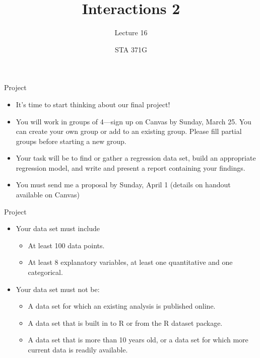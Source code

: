 \documentclass{beamer}\usepackage[]{graphicx}\usepackage[]{color}
\title{Interactions 2}
\subtitle{Lecture 16}
\author{STA 371G}
\begin{document}
  
  

  \frame{\maketitle}



  \begin{darkframes}
      \begin{frame}{Project}
      \begin{itemize}
        \item It's time to start thinking about our final project!
	\item You will work in groups of 4---sign up on Canvas by Sunday, March 25. You can create your own group or add to an existing group. Please fill partial groups before starting a new group.
	\item Your task will be to find or gather a regression data set, build an appropriate regression model, and write and present a report containing your findings.
	\item You must send me a proposal by Sunday, April 1 (details on handout available on Canvas)
      \end{itemize}
    \end{frame}
    \begin{frame}{Project}
      \begin{itemize}
      \item Your data set must include
        \begin{itemize}
        \item  At least 100 data points.
        \item  At least 8 explanatory variables, at least one quantitative and one categorical.
        \end{itemize}
      \item Your data set must not be:
        \begin{itemize}
        \item A data set for which an existing analysis is published online.
        \item A data set that is built in to R or from the R dataset package.
        \item A data set that is more than 10 years old, or a data set for which more current data is readily available.
        \end{itemize}
      \end{itemize}
    \end{frame}


\end{darkframes}
\end{document}
